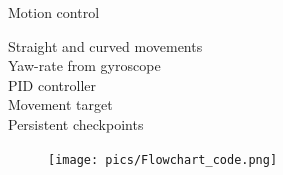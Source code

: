 \documentclass{beamer}
\begin{document}
\begin{frame}{Motion control}
	\begin{minipage}{0.45\textwidth}
		Straight and curved movements\\
		
		Yaw-rate from gyroscope \\
		
		PID controller \\
		
		Movement target \\
		
		Persistent checkpoints\\
	\end{minipage}
	\pause
	\begin{minipage}{0.54\textwidth}\raggedleft
		\begin{figure}
			\centering
			\texttt{[image: pics/Flowchart\_code.png]}
		\end{figure}
	\end{minipage}
\end{frame}

\end{document}
